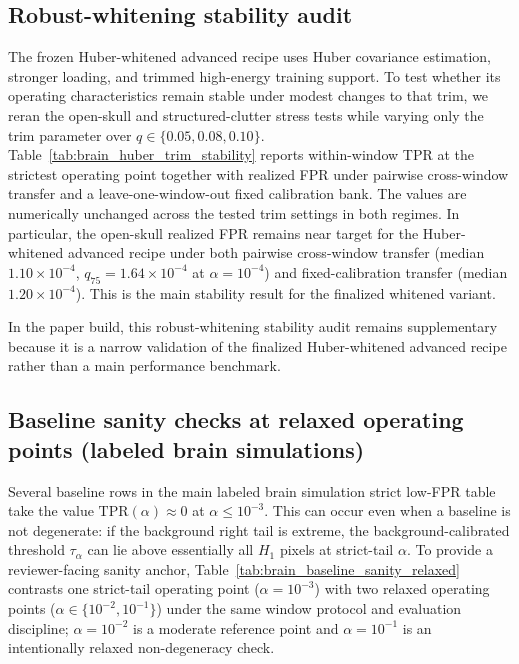 \subsection{Robust-whitening stability audit}
\label{app:brain-huber-trim-stability}
\ifSUPPLEMENTONLY
The frozen Huber-whitened advanced recipe uses Huber covariance estimation, stronger loading, and trimmed high-energy training support. To test whether its operating characteristics remain stable under modest changes to that trim, we reran the open-skull and structured-clutter stress tests while varying only the trim parameter over $q\in\{0.05,0.08,0.10\}$. Table~\ref{tab:brain_huber_trim_stability} reports within-window TPR at the strictest operating point together with realized FPR under pairwise cross-window transfer and a leave-one-window-out fixed calibration bank.
\noindent The values are numerically unchanged across the tested trim settings in both regimes. In particular, the open-skull realized FPR remains near target for the Huber-whitened advanced recipe under both pairwise cross-window transfer (median $1.10\times 10^{-4}$, $q_{75}=1.64\times 10^{-4}$ at $\alpha=10^{-4}$) and fixed-calibration transfer (median $1.20\times 10^{-4}$). This is the main stability result for the finalized whitened variant.

\else
\noindent In the paper build, this robust-whitening stability audit remains supplementary because it is a narrow validation of the finalized Huber-whitened advanced recipe rather than a main performance benchmark.
\fi

\subsection{Baseline sanity checks at relaxed operating points (labeled brain simulations)}
\label{app:brain-baseline-sanity-relaxed}
\ifSUPPLEMENTONLY
Several baseline rows in the main labeled brain simulation strict low-FPR table take the value $\mathrm{TPR}(\alpha)\approx 0$ at $\alpha\le 10^{-3}$. This can occur even when a baseline is not degenerate: if the background right tail is extreme, the background-calibrated threshold $\tau_\alpha$ can lie above essentially all $H_1$ pixels at strict-tail $\alpha$.
To provide a reviewer-facing sanity anchor, Table~\ref{tab:brain_baseline_sanity_relaxed} contrasts one strict-tail operating point ($\alpha=10^{-3}$) with two relaxed operating points ($\alpha\in\{10^{-2},10^{-1}\}$) under the same window protocol and evaluation discipline; $\alpha=10^{-2}$ is a moderate reference point and $\alpha=10^{-1}$ is an intentionally relaxed non-degeneracy check.

